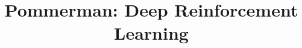 \documentclass{article}
\title{Pommerman: Deep Reinforcement Learning}
\begin{document}

\maketitle












%
%
%

\vfill
\pagebreak




\vfill
\pagebreak

\end{document}
